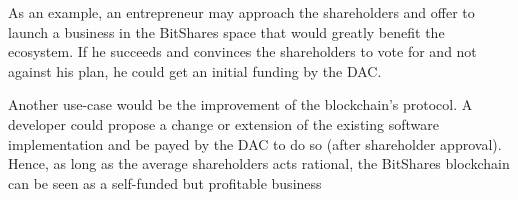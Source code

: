 As an example, an entrepreneur may approach the shareholders and offer to
launch a business in the BitShares space that would greatly benefit the
ecosystem. If he succeeds and convinces the shareholders to vote for and not
against his plan, he could get an initial funding by the DAC.

Another use-case would be the improvement of the blockchain's protocol. A
developer could propose a change or extension of the existing software
implementation and be payed by the DAC to do so (after shareholder approval).
Hence, as long as the average shareholders acts rational, the BitShares
blockchain can be seen as a self-funded but profitable business

